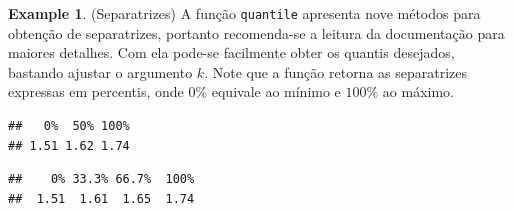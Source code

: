 \documentclass[
]{book}
\newenvironment{Shaded}{\begin{snugshade}}{\end{snugshade}}
\newcommand{\CommentTok}[1]{\textcolor[rgb]{0.56,0.35,0.01}{\textit{#1}}}
\newcommand{\DataTypeTok}[1]{\textcolor[rgb]{0.13,0.29,0.53}{#1}}
\newcommand{\DecValTok}[1]{\textcolor[rgb]{0.00,0.00,0.81}{#1}}
\newcommand{\KeywordTok}[1]{\textcolor[rgb]{0.13,0.29,0.53}{\textbf{#1}}}
\newcommand{\NormalTok}[1]{#1}
\newcommand{\OperatorTok}[1]{\textcolor[rgb]{0.81,0.36,0.00}{\textbf{#1}}}
\newcommand{\StringTok}[1]{\textcolor[rgb]{0.31,0.60,0.02}{#1}}
\theoremstyle{definition}
\theoremstyle{definition}
\newtheorem{example}{Example}[chapter]
\theoremstyle{definition}
\theoremstyle{remark}
\begin{document}
\begin{example}
\protect\hypertarget{exm:separatrizes}{}{\label{exm:separatrizes} }(Separatrizes) A função \texttt{quantile} apresenta nove métodos para obtenção de separatrizes, portanto recomenda-se a leitura da documentação para maiores detalhes. Com ela pode-se facilmente obter os quantis desejados, bastando ajustar o argumento \(k\). Note que a função retorna as separatrizes expressas em percentis, onde \(0\%\) equivale ao mínimo e \(100\%\) ao máximo.
\end{example}

\begin{Shaded}
\end{Shaded}

\begin{verbatim}
##   0%  50% 100% 
## 1.51 1.62 1.74
\end{verbatim}

\begin{Shaded}
\end{Shaded}

\begin{verbatim}
##    0% 33.3% 66.7%  100% 
##  1.51  1.61  1.65  1.74
\end{verbatim}

\begin{Shaded}
\end{Shaded}
\end{document}
